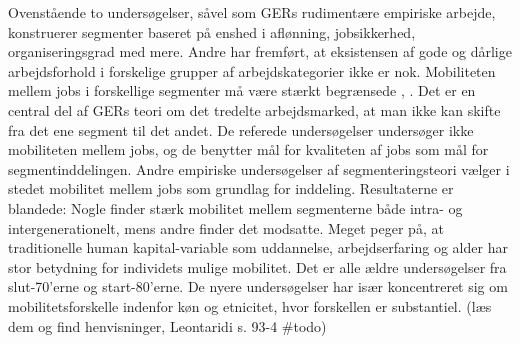 Ovenstående to undersøgelser, såvel som GERs rudimentære empiriske arbejde, konstruerer segmenter baseret på enshed i aflønning, jobsikkerhed, organiseringsgrad med mere.  
Andre har fremført, at eksistensen af gode og dårlige arbejdsforhold i forskelige grupper af arbejdskategorier ikke er nok. Mobiliteten mellem jobs i forskellige segmenter må være stærkt begrænsede \parencite[92]{Leontaridi1998}, \parencite[793]{DickensLang1985}.  %
Det er en central del af GERs teori om det tredelte arbejdsmarked, at man ikke kan skifte fra det ene segment til det andet. De referede undersøgelser undersøger ikke mobiliteten mellem jobs, og de benytter mål for kvaliteten af jobs som mål for segmentinddelingen. Andre empiriske undersøgelser af segmenteringsteori vælger i stedet mobilitet mellem jobs som grundlag for inddeling.
Resultaterne er blandede: Nogle finder  stærk mobilitet mellem segmenterne både intra- og intergenerationelt, mens andre finder det modsatte. Meget peger på, at traditionelle human kapital-variable som uddannelse, arbejdserfaring og alder har stor betydning for individets mulige mobilitet. Det er alle ældre undersøgelser fra slut-70'erne og start-80'erne. De nyere undersøgelser har især koncentreret sig om mobilitetsforskelle indenfor køn og etnicitet, hvor forskellen er substantiel. (læs dem og find henvisninger, Leontaridi s. 93-4 \#todo)




